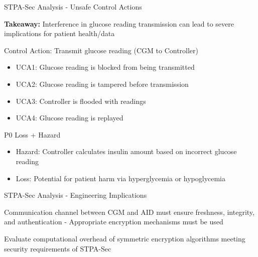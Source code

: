\documentclass[aspectratio=169]{beamer}
\begin{document}
\begin{frame}[t]{STPA-Sec Analysis - Unsafe Control Actions}
    \begin{alertblock}{}
        \centering
        \footnotesize\textbf{Takeaway: } Interference in glucose reading transmission can lead to severe implications for patient health/data
    \end{alertblock}
    \vspace{0.6cm}
    \begin{block}{Control Action: Transmit glucose reading (CGM to Controller)}
        \begin{itemize}
            \item UCA1: Glucose reading is blocked from being transmitted
            \item UCA2: Glucose reading is tampered before transmission
            \item UCA3: Controller is flooded with readings
            \item UCA4: Glucose reading is replayed
        \end{itemize}
    \end{block}
    
    \begin{block}{P0 Loss + Hazard}
        \begin{itemize}
            \item Hazard: Controller calculates insulin amount based on incorrect glucose reading
            \item Loss: Potential for patient harm via hyperglycemia or hypoglycemia
        \end{itemize}
    \end{block}
\end{frame}

\begin{frame}{STPA-Sec Analysis - Engineering Implications}
    \begin{alertblock}{}
        \centering
        \large Communication channel between CGM and AID must ensure freshness, integrity, and authentication - Appropriate encryption mechanisms must be used
    \end{alertblock}
    \vspace{.5cm}
    \begin{alertblock}{}
        \centering
        \large Evaluate computational overhead of symmetric encryption algorithms meeting security requirements of STPA-Sec
    \end{alertblock}
    
\end{frame}
\end{document}
